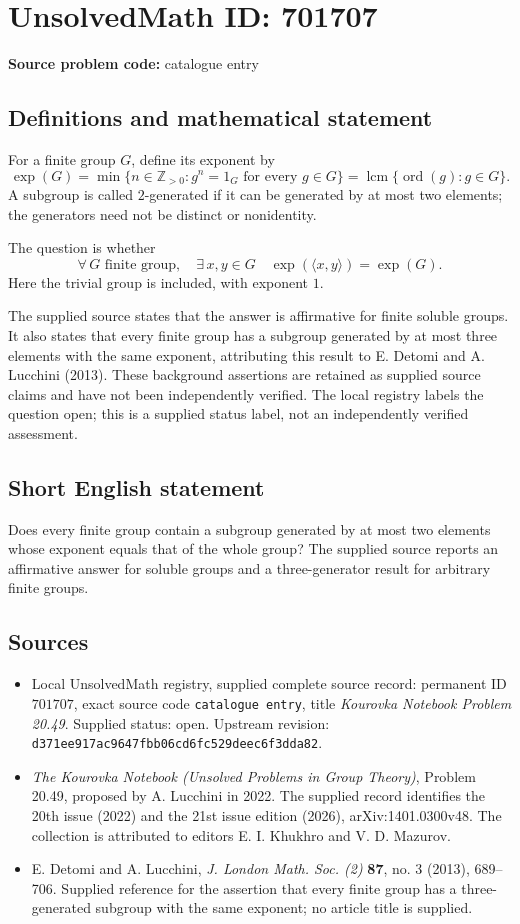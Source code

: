 \documentclass[11pt]{article}
\newcommand{\Z}{\mathbb{Z}}
\begin{document}
\section*{UnsolvedMath ID: 701707}
\textbf{Source problem code:} catalogue entry
\subsection{Definitions and mathematical statement}
For a finite group \(G\), define its exponent by
\[
\exp(G)=\min\{n\in\Z_{>0}:g^n=1_G\text{ for every }g\in G\}
=\operatorname{lcm}\{\operatorname{ord}(g):g\in G\}.
\]
A subgroup is called \(2\)-generated if it can be generated by at most two elements; the generators need not be distinct or nonidentity.

The question is whether
\[
\forall\,G\text{ finite group},\quad \exists\,x,y\in G\quad
\exp(\langle x,y\rangle)=\exp(G).
\]
Here the trivial group is included, with exponent \(1\).

The supplied source states that the answer is affirmative for finite soluble groups. It also states that every finite group has a subgroup generated by at most three elements with the same exponent, attributing this result to E. Detomi and A. Lucchini (2013). These background assertions are retained as supplied source claims and have not been independently verified. The local registry labels the question open; this is a supplied status label, not an independently verified assessment.
\subsection{Short English statement}
Does every finite group contain a subgroup generated by at most two elements whose exponent equals that of the whole group? The supplied source reports an affirmative answer for soluble groups and a three-generator result for arbitrary finite groups.
\subsection{Sources}
\begin{itemize}
\item Local UnsolvedMath registry, supplied complete source record: permanent ID \(701707\), exact source code \texttt{catalogue entry}, title \emph{Kourovka Notebook Problem 20.49}. Supplied status: open. Upstream revision: \texttt{d371ee917ac9647fbb06cd6fc529deec6f3dda82}.
\item \emph{The Kourovka Notebook (Unsolved Problems in Group Theory)}, Problem 20.49, proposed by A. Lucchini in 2022. The supplied record identifies the 20th issue (2022) and the 21st issue edition (2026), arXiv:1401.0300v48. The collection is attributed to editors E. I. Khukhro and V. D. Mazurov.
\item E. Detomi and A. Lucchini, \emph{J. London Math. Soc. (2)} \textbf{87}, no. 3 (2013), 689--706. Supplied reference for the assertion that every finite group has a three-generated subgroup with the same exponent; no article title is supplied.
\end{itemize}
\end{document}

